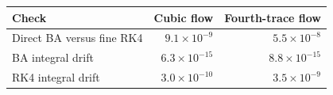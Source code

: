\begin{center}
\begin{tabular}{lrr}
\hline
Check & Cubic flow & Fourth-trace flow\\
\hline
Direct BA versus fine RK4 & $9.1\times10^{-9}$ & $5.5\times10^{-8}$\\
BA integral drift & $6.3\times10^{-15}$ & $8.8\times10^{-15}$\\
RK4 integral drift & $3.0\times10^{-10}$ & $3.5\times10^{-9}$\\
\hline
\end{tabular}
\end{center}

